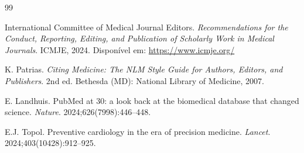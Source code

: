 \documentclass[12pt,a4paper]{article}
\begin{document}
\begin{thebibliography}{99}

International Committee of Medical Journal Editors.
\textit{Recommendations for the Conduct, Reporting, Editing,
and Publication of Scholarly Work in Medical Journals}.
ICMJE, 2024. Dispon\'ivel em: \url{https://www.icmje.org/}

K. Patrias.
\textit{Citing Medicine: The NLM Style Guide for Authors,
Editors, and Publishers}. 2nd ed. Bethesda (MD):
National Library of Medicine, 2007.

E. Landhuis.
PubMed at 30: a look back at the biomedical database that
changed science. \textit{Nature}. 2024;626(7998):446--448.

E.J. Topol.
Preventive cardiology in the era of precision medicine.
\textit{Lancet}. 2024;403(10428):912--925.

\end{thebibliography}
\end{document}
